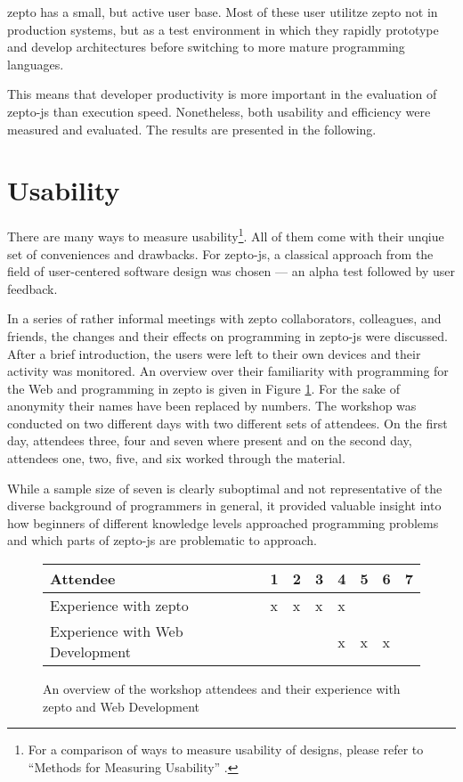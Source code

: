 \documentclass[oneside,11pt,xetex]{scrbook}
\begin{document}
zepto has a small, but active user base. Most of these user utilitze zepto
not in production systems, but as a test environment in which they rapidly
prototype and develop architectures before switching to more mature programming
languages.

This means that developer productivity is more important in the evaluation of
zepto-js than execution speed. Nonetheless, both usability and efficiency
were measured and evaluated. The results are presented in the following.

\section{Usability}

There are many ways to measure usability\footnote{For a comparison of ways
to measure usability of designs, please refer to ``Methods for Measuring
Usability'' \parencite{USBL}.}. All of them come with their unqiue set of
conveniences and drawbacks. For zepto-js, a classical approach from the
field of user-centered software design was chosen --- an alpha test
followed by user feedback.

In a series of rather informal meetings with zepto collaborators, colleagues,
and friends, the changes and their effects on programming in zepto-js were
discussed. After a brief introduction, the users were left to their own
devices and their activity was monitored. An overview over their  familiarity
with programming for the Web and programming in zepto is given in Figure
\ref{fig:attendees}. For the sake of anonymity their names have been replaced
by numbers. The workshop was conducted on two different days with two different
sets of attendees. On the first day, attendees three, four and seven where present
and on the second day, attendees one, two, five, and six worked through the
material.

While a sample size of seven is clearly suboptimal and not representative
of the diverse background of programmers in general, it provided valuable
insight into how beginners of different knowledge levels approached
programming problems and which parts of zepto-js are problematic to approach.

\begin{figure}
\centering
  \begin{tabu}{| l | l | l | l | l | l | l | l |}
  \hline
  \rowfont{\footnotesize}
  Attendee                        & 1 & 2 & 3 & 4 & 5 & 6 & 7 \\ \hline
  \rowfont{\footnotesize}
  Experience with zepto           & x & x & x & x &   &   &   \\ \hline
  \rowfont{\footnotesize}
  Experience with Web Development &   &   &   & x & x & x &   \\ \hline
  \end{tabu}
  \caption{An overview of the workshop attendees and their experience with zepto and Web Development}
\label{fig:attendees}
\end{figure}
\end{document}
